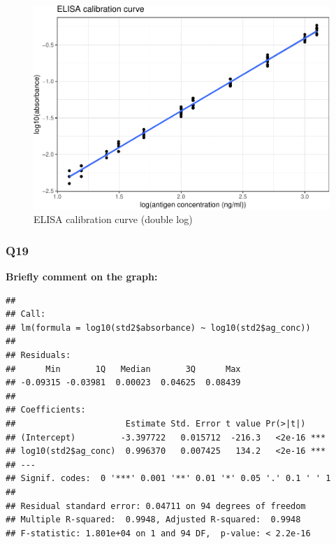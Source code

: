\documentclass[
]{article}
\newenvironment{Shaded}{\begin{snugshade}}{\end{snugshade}}
\newcommand{\KeywordTok}[1]{\textcolor[rgb]{0.13,0.29,0.53}{\textbf{#1}}}
\newcommand{\NormalTok}[1]{#1}
\newcommand{\OperatorTok}[1]{\textcolor[rgb]{0.81,0.36,0.00}{\textbf{#1}}}
\newcommand{\StringTok}[1]{\textcolor[rgb]{0.31,0.60,0.02}{#1}}
\begin{document}
\begin{figure}
\includegraphics[width=1\linewidth]{2020-03-08-immunoassay-in-silico_files/figure-latex/elisa-std-fin-1} \caption{ELISA calibration curve (double log)}\label{fig:elisa-std-fin}
\end{figure}

\hypertarget{q19}{%
\subsubsection*{Q19}\label{q19}}

\textbf{Briefly comment on the graph:}

\begin{Shaded}
\end{Shaded}

\begin{verbatim}
## 
## Call:
## lm(formula = log10(std2$absorbance) ~ log10(std2$ag_conc))
## 
## Residuals:
##      Min       1Q   Median       3Q      Max 
## -0.09315 -0.03981  0.00023  0.04625  0.08439 
## 
## Coefficients:
##                      Estimate Std. Error t value Pr(>|t|)    
## (Intercept)         -3.397722   0.015712  -216.3   <2e-16 ***
## log10(std2$ag_conc)  0.996370   0.007425   134.2   <2e-16 ***
## ---
## Signif. codes:  0 '***' 0.001 '**' 0.01 '*' 0.05 '.' 0.1 ' ' 1
## 
## Residual standard error: 0.04711 on 94 degrees of freedom
## Multiple R-squared:  0.9948, Adjusted R-squared:  0.9948 
## F-statistic: 1.801e+04 on 1 and 94 DF,  p-value: < 2.2e-16
\end{verbatim}
\end{document}

